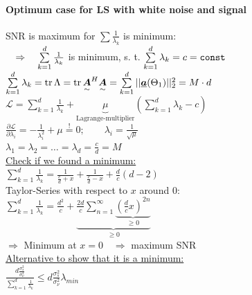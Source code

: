 \begin{doublespace}
\paragraph{Optimum case for LS with white noise and signal}
SNR is maximum for $\sum \frac{1}{\lambda_k}$ is minimum:\\
$\quad\Rightarrow\quad\sum\limits_{k=1}^d\frac{1}{\lambda_k}$ is minimum, s. t. $\sum\limits_{k=1}^d\lambda_k=c=\texttt{const}$\\
$\sum\limits_{k=1}^d\lambda_k=\operatorname{tr}\Lambda=\operatorname{tr}\underset{\sim}{\boldsymbol {A}}^H\underset{\sim}{\boldsymbol {A}}=\sum\limits_{k=1}^d||\underline{\boldsymbol {a}}(\Theta_1)||_2^2=M\cdot d$\\
$\mathcal{L}=\sum\limits_{k=1}^d\frac{1}{\lambda_k}+\underbrace{\mu}_{\text{Lagrange-multiplier}}(\sum\limits_{k=1}^d\lambda_k-c)$\\
$\frac{\partial\mathcal{L}}{\partial\lambda_i}=-\frac{1}{\lambda_i^2}+\mu\stackrel{!}{=}0;\qquad \lambda_i=\frac{1}{\sqrt{\mu}}$\\
$\lambda_1=\lambda_2=\ldots=\lambda_d=\frac{c}{d}=M$\\
\underline{Check if we found a minimum:}\\
$\sum\limits_{k=1}^d\frac{1}{\lambda_k}=\frac{1}{\frac{c}{d}+x}+\frac{1}{\frac{c}{d}-x}+\frac{d}{c}(d-2)$\\
Taylor-Series with respect to $x$ around $0$:\\
$\sum\limits_{k=1}^d\frac{1}{\lambda_k}=\frac{d^2}{c}+\underbrace{\frac{2d}{c}\sum\limits_{n=1}^\infty\underbrace{(\frac{d}{c}x)^{2n}}_{\geq0}}_{\geq 0}$\\
$\Rightarrow$ Minimum at $x=0\quad \Rightarrow$ maximum SNR\\
\underline{Alternative to show that it is a minimum:}\\
$\frac{d\frac{\sigma_s^2}{\sigma_\nu^2}}{\sum\limits_{k=1}^d\frac{1}{\lambda_k}}\leq d\frac{\sigma_s^2}{\sigma_\nu^2}\lambda_{min}$\\ \\


\end{doublespace}
